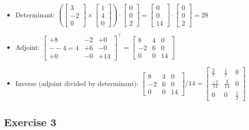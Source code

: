 \documentclass[11pt]{article}
\begin{document}
\begin{itemize}
	\item Determinant:
$\left(\begin{bmatrix}
3 \\ -2 \\ 0
\end{bmatrix}\times
\begin{bmatrix}
1 \\ 4 \\ 0
\end{bmatrix}
\right)\cdot
\begin{bmatrix}
0 \\ 0 \\ 2
\end{bmatrix}=
\begin{bmatrix}
0 \\ 0 \\ 14
\end{bmatrix}\cdot
\begin{bmatrix}
0 \\ 0 \\ 2
\end{bmatrix}=28
$
	\item Adjoint:
$
\begin{bmatrix}
+8 & -2 & +0 \\
--4=4 & +6 & -0 \\
+0 & -0 & +14
\end{bmatrix}^\intercal=
\begin{bmatrix}
8 & 4 & 0 \\
-2 & 6 & 0 \\
0 & 0 & 14
\end{bmatrix}
$
	\item Inverse (adjoint divided by determinant):
$
\begin{bmatrix}
8 & 4 & 0 \\
-2 & 6 & 0 \\
0 & 0 & 14
\end{bmatrix}/14=
\begin{bmatrix}
\frac{2}{7} & \frac{1}{7} & 0 \\
\frac{-1}{14} & \frac{3}{14} & 0 \\
0 & 0 & \frac{1}{2}
\end{bmatrix}
$

\end{itemize}

\subsection{Exercise 3}
\end{document}
